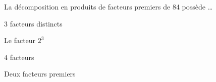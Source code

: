 \begin{QCM}
\begin{GroupeQCM}
    \begin{exercice}
      La décomposition en produits de facteurs premiers de 84 possède \ldots
      \begin{ChoixQCM}{4}
      \item 3 facteurs distincts
      \item Le facteur $2^3$
      \item 4 facteurs
      \item Deux facteurs premiers
      \end{ChoixQCM}
\begin{corrige}
   \end{corrige}
    \end{exercice}
    
\end{GroupeQCM}
\end{QCM}

  